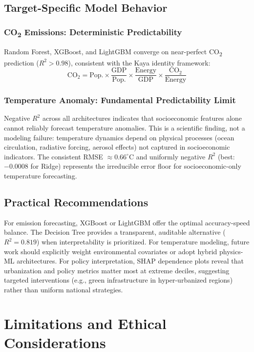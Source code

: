 \documentclass[conference]{IEEEtran}
\begin{document}
\subsection{Target-Specific Model Behavior}

\subsubsection{CO\textsubscript{2} Emissions: Deterministic Predictability}

Random Forest, XGBoost, and LightGBM converge on near-perfect
CO\textsubscript{2} prediction ($R^2 > 0.98$), consistent with the Kaya
identity framework:
\[
\text{CO}_2 = \text{Pop.} \times \frac{\text{GDP}}{\text{Pop.}} \times
\frac{\text{Energy}}{\text{GDP}} \times \frac{\text{CO}_2}{\text{Energy}}
\]

\subsubsection{Temperature Anomaly: Fundamental Predictability Limit}

Negative $R^2$ across all architectures indicates that socioeconomic features
alone cannot reliably forecast temperature anomalies. This is a scientific
finding, not a modeling failure: temperature dynamics depend on physical
processes (ocean circulation, radiative forcing, aerosol effects) not captured
in socioeconomic indicators. The consistent RMSE $\approx 0.66^\circ$C and
uniformly negative $R^2$ (best: $-0.0008$ for Ridge) represents the
irreducible error floor for socioeconomic-only temperature forecasting.

\subsection{Practical Recommendations}

For emission forecasting, XGBoost or LightGBM offer the optimal
accuracy-speed balance. The Decision Tree provides a transparent, auditable
alternative ($R^2 = 0.819$) when interpretability is prioritized. For
temperature modeling, future work should explicitly weight environmental
covariates or adopt hybrid physics-ML architectures. For policy interpretation,
SHAP dependence plots reveal that urbanization and policy metrics matter most
at extreme deciles, suggesting targeted interventions (e.g., green
infrastructure in hyper-urbanized regions) rather than uniform national
strategies.

\section{Limitations and Ethical Considerations}
\end{document}
